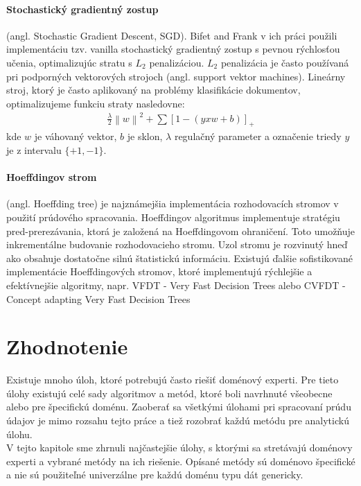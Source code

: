 \paragraph{Stochastický gradientný zostup} (angl. Stochastic Gradient Descent, SGD). Bifet and Frank v ich práci použili implementáciu tzv. vanilla stochastický gradientný zostup s pevnou rýchlosťou učenia, optimalizujúc stratu s $L_2$ penalizáciou. $L_2$ penalizácia je často používaná pri podporných vektorových strojoch (angl. support vektor machines). Lineárny stroj, ktorý je často aplikovaný na problémy klasifikácie dokumentov, optimalizujeme funkciu straty nasledovne:
\begin{align*}
\frac{\lambda }{2}\left \| w \right \|^{2}+\sum [1-(yxw + b)]_{+}
\end{align*}
kde $w$ je váhovaný vektor, $b$ je sklon, $\lambda$ regulačný parameter a označenie triedy $y$ je z intervalu $\{+1, -1\}$.

\paragraph{Hoeffdingov strom} (angl. Hoeffding tree) je najznámejšia implementácia rozhodovacích stromov v použití prúdového spracovania. Hoeffdingov algoritmus implementuje stratégiu pred-prerezávania, ktorá je založená na Hoeffdingovom ohraničení. Toto umožňuje inkrementálne budovanie rozhodovacieho stromu. Uzol stromu je rozvinutý hneď ako obsahuje dostatočne silnú štatistickú informáciu. Existujú ďalšie sofistikované implementácie Hoeffdingových stromov, ktoré implementujú rýchlejšie a efektívnejšie algoritmy, napr. VFDT - Very Fast Decision Trees \citep{domingos2000mining} alebo CVFDT - Concept adapting Very Fast Decision Trees \citep{hulten2001mining}


\section{Zhodnotenie}
Existuje mnoho úloh, ktoré potrebujú často riešiť doménový experti. Pre tieto úlohy existujú celé sady algoritmov a metód, ktoré boli navrhnuté všeobecne alebo pre špecifickú doménu. Zaoberať sa všetkými úlohami pri spracovaní prúdu údajov je mimo rozsahu tejto práce a tiež rozobrať každú metódu pre analytickú úlohu. \\
V tejto kapitole sme zhrnuli najčastejšie úlohy, s ktorými sa stretávajú doménovy experti a vybrané metódy na ich riešenie. Opísané metódy sú doménovo špecifické a nie sú použiteľné univerzálne pre každú doménu typu dát genericky.
